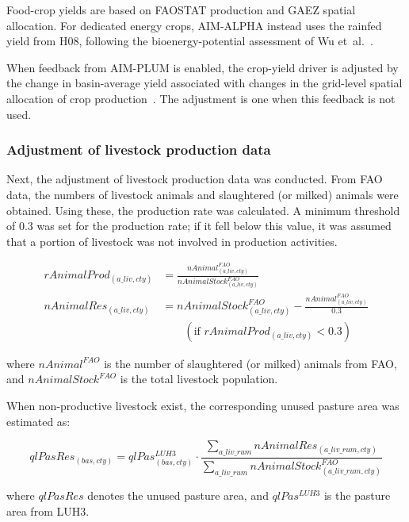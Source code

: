 Food-crop yields are based on FAOSTAT production and GAEZ spatial allocation. For dedicated energy crops, AIM-ALPHA instead uses the rainfed yield from H08, following the bioenergy-potential assessment of Wu et~al.~\cite{hanasakiIntegratedModelAssessment2008a,hanasakiIntegratedModelAssessment2008b,wuGlobalAdvancedBioenergy2019}.

When feedback from AIM-PLUM is enabled, the crop-yield driver is adjusted by the change in basin-average yield associated with changes in the grid-level spatial allocation of crop production~\cite{hasegawaGlobalLanduseAllocation2017}. The adjustment is one when this feedback is not used.


\subsubsection{Adjustment of livestock production data}

Next, the adjustment of livestock production data was conducted. 
From FAO data, the numbers of livestock animals and slaughtered (or milked) animals were obtained. 
Using these, the production rate was calculated. 
A minimum threshold of 0.3 was set for the production rate; if it fell below this value, 
it was assumed that a portion of livestock was not involved in production activities.

\begin{align}
rAnimalProd_{(a\_liv,cty)} &=
\frac{nAnimal^{FAO}_{(a\_liv,cty)}}{nAnimalStock^{FAO}_{(a\_liv,cty)}} \\
nAnimalRes_{(a\_liv,cty)} &=
nAnimalStock^{FAO}_{(a\_liv,cty)} -
\frac{nAnimal^{FAO}_{(a\_liv,cty)}}{0.3}
\nonumber\\[-0.3em]
&\quad
\quad (\text{if } rAnimalProd_{(a\_liv,cty)} < 0.3)
\end{align}

where \( nAnimal^{FAO} \) is the number of slaughtered (or milked) animals from FAO,
and \( nAnimalStock^{FAO} \) is the total livestock population.

When non-productive livestock exist, the corresponding unused pasture area was estimated as:

\begin{equation}
qlPasRes_{(bas,cty)} =
qlPas^{LUH3}_{(bas,cty)} \cdot
\frac{\sum_{a\_liv\_rum}nAnimalRes_{(a\_liv\_rum,cty)}}
{\sum_{a\_liv\_rum}nAnimalStock^{FAO}_{(a\_liv\_rum,cty)}}
\end{equation}

where \( qlPasRes \) denotes the unused pasture area,
and \( qlPas^{LUH3} \) is the pasture area from LUH3.

